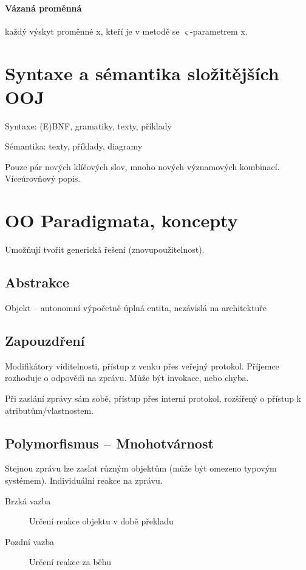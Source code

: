 \documentclass[a4paper, 11pt]{report}
\begin{document}
\paragraph{Vázaná proměnná}
každý výskyt proměnné x, kteří je v metodě se $\varsigma$-parametrem x.

\section{Syntaxe a sémantika složitějších OOJ}

Syntaxe: (E)BNF, gramatiky, texty, příklady

Sémantika: texty, příklady, diagramy

Pouze pár nových klíčových slov, mnoho nových významových kombinací. Víceúrovňový popis.

\section{OO Paradigmata, koncepty}

Umožňují tvořit generická řešení (znovupoužitelnost).

\subsection{Abstrakce} Objekt -- autonomní výpočetně úplná entita, nezávislá na architektuře

\subsection{Zapouzdření}
Modifikátory viditelnosti, přístup z venku přes veřejný protokol. Příjemce rozhoduje o odpovědi na zprávu. Může být invokace, nebo chyba.

Při zaslání zprávy sám sobě, přístup přes interní protokol, rozšířený o přístup k atributům/vlastnostem.

\subsection{Polymorfismus -- Mnohotvárnost}

Stejnou zprávu lze zaslat různým objektům (může být omezeno typovým systémem). Individuální reakce na zprávu.

\begin{description}
	\item[Brzká vazba] Určení reakce objektu v době překladu
	\item[Pozdní vazba] Určení reakce za běhu
\end{description}
\end{document}
